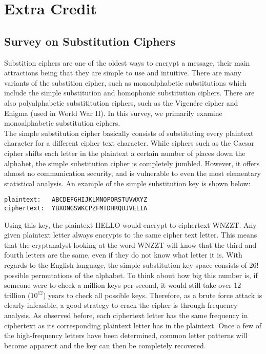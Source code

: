 \documentclass[a4paper,twoside,10pt]{report}
\begin{document}
\vspace{4mm}

\chapter{Extra Credit}\label{extra}

\section{Survey on Substitution Ciphers}\label{ciphersurvey}

Substition ciphers are one of the oldest ways to encrypt a message, their main attractions being that they are simple to use and intuitive. There are many variants of the substition cipher, such as monoalphabetic substitutions which include the simple substitution and homophonic substitution ciphers. There are also polyalphabetic substititution ciphers, such as the Vigen\'ere cipher and Enigma (used in World War II). In this survey, we primarily examine monoalphabetic substitution ciphers. \\

The simple substitution cipher basically consists of substituting every plaintext character for a different cipher text character. While ciphers such as the Caesar cipher shifts each letter in the plaintext a certain number of places down the alphabet, the simple substitution cipher is completely jumbled. However, it offers almost no communication security, and is vulnerable to even the most elementary statistical analysis. An example of the simple substitution key is shown below:

\begin{lstlisting}
plaintext:   ABCDEFGHIJKLMNOPQRSTUVWXYZ
ciphertext:  YBXONGSWKCPZFMTDHRQUJVELIA
\end{lstlisting}

\vspace{4mm}
Using this key, the plaintext HELLO would encrypt to ciphertext WNZZT. Any given plaintext letter always encrypts to the same cipher text letter. This means that the cryptanalyst looking at the word WNZZT will know that the third and fourth letters are the same, even if they do not know what letter it is. With regards to the English language, the simple substitution key space consists of 26! possible permutations of the alphabet. To think about how big this number is, if someone were to check a million keys per second, it would still take over 12 trillion ($10^{12}$) years to check all possible keys. Therefore, as a brute force attack is clearly infeasible, a good strategy to crack the cipher is through frequency analysis. As observed before, each ciphertext letter has the same frequency in ciphertext as its corresponding plaintext letter has in the plaintext. Once a few of the high-frequency letters have been determined, common letter patterns will become apparent and the key can then be completely recovered.
\end{document}
